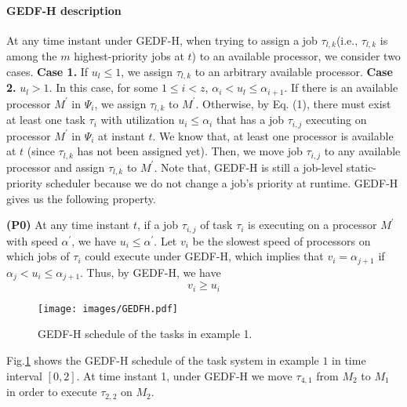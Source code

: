 \documentclass[Times, 10pt,twocolumn]{article}
\theoremstyle{definition}
\begin{document}
\paragraph{GEDF-H description} At any time instant  under GEDF-H, when trying to assign a job $\tau_{l,k}$(i.e., $\tau_{l,k}$ is among the $m$ highest-priority jobs at $t$) to an available processor, we consider two cases. \textbf{Case 1.} If $u_l\leq 1$, we assign $\tau_{l,k}$ to an arbitrary available processor. \textbf{Case 2.} $u_l> 1$. In this case, for some $1\leq i< z$, $\alpha_i< u_l\leq \alpha_{i+1}$. If there is an available processor $M^{'}$ in $\Psi_i$, we assign $\tau_{l,k}$ to $M^{'}$. Otherwise, by Eq. (1), there must exist at least one task $\tau_i$ with utilization $u_i \leq \alpha_i$ that has a job $\tau_{i,j}$ executing on processor $M^{'}$ in $\Psi_i$ at instant $t$. We know that, at least one processor is available at $t$ (since $\tau_{l,k}$ has not been assigned yet). Then, we move job $\tau_{i,j}$ to any available processor and assign $\tau_{l,k}$ to $M^{'}$. Note that, GEDF-H is still a job-level static-priority scheduler because we do not change a job's priority at runtime. GEDF-H gives us the following property.

\vspace{-1mm}
\begin{changemargin}{4mm}{4mm}
\textbf{(P0)} At any time instant $t$, if a job $\tau_{i,j}$ of task $\tau_i$ is executing on a processor $M^{'}$ with speed $\alpha^{'}$, we have $u_i\leq \alpha^{'}$. Let $v_i$ be the slowest speed of processors on which jobs of $\tau_i$ could execute under GEDF-H, which implies that $v_i= \alpha_{j+1}$ if $\alpha_j < u_i \leq \alpha_{j+1}$. Thus, by GEDF-H, we have
\begin{equation}
\label{eq:GEDF-H}
v_i \geq u_i
\end{equation}
\end{changemargin}
\vspace{-1mm}

\begin{figure}[t]
	\begin{center}
	\texttt{[image: images/GEDFH.pdf]} 
	\end{center} 
\vspace{-5mm}
\caption{\small GEDF-H schedule of the tasks in example 1.}
\vspace{-5mm}
\label{fig:GEDFH}
\end{figure}

Fig.\ref{fig:GEDFH} shows the GEDF-H schedule of the task system in example $1$ in time interval $[0, 2]$. At time instant 1, under GEDF-H we move $\tau_{4,1}$ from $M_2$ to $M_1$ in order to execute $\tau_{2,2}$ on $M_2$. 
\end{document}
